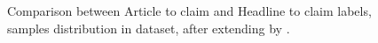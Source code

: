 \begin{figure}%
	\centering
	\qquad
	\caption{Comparison between Article to claim and Headline to claim labels, samples distribution in \cite{stance_persian} dataset, after extending by \cite{parsfever} .}%
	\label{fig:datab1}%
\end{figure}

